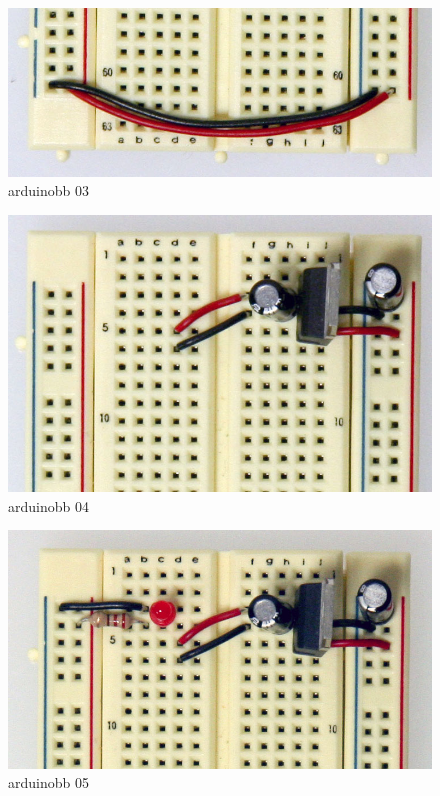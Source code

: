 \begin{figure}[!htb]
 \centering
 \includegraphics[scale=0.3]{img/arduino_breadboard/arduinobb_03.jpg}
 \caption{arduinobb 03}
 \label{arduinobb 03}
\end{figure}


\begin{figure}[!htb]
 \centering
 \includegraphics[scale=0.3]{img/arduino_breadboard/arduinobb_04.jpg}
 \caption{arduinobb 04}
 \label{arduinobb 04}
\end{figure}


\begin{figure}[!htb]
 \centering
 \includegraphics[scale=0.3]{img/arduino_breadboard/arduinobb_05.jpg}
 \caption{arduinobb 05}
 \label{arduinobb 05}
\end{figure}


